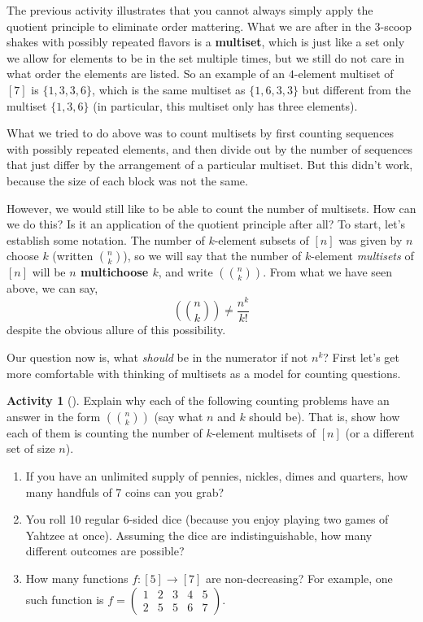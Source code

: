 \documentclass[10pt,]{book}
\newcommand{\terminology}[1]{\textbf{#1}}
\theoremstyle{plain}
\theoremstyle{definition}
\theoremstyle{definition}
\theoremstyle{definition}
\newtheorem{activity}[project]{Activity}
\theoremstyle{definition}
\numberwithin{equation}{chapter}
\newcommand{\mchoose}[2]{\left(\!\binom{#1}{#2}\!\right)}
\newcommand{\twoline}[2]{\begin{pmatrix}#1 \\ #2 \end{pmatrix}}
\newcommand{\amp}{&}
\begin{document}
\hypertarget{p-712}{}%
The previous activity illustrates that you cannot always simply apply the quotient principle to eliminate order mattering.  What we are after in the 3-scoop shakes with possibly repeated flavors is a \terminology{multiset}, which is just like a set only we allow for elements to be in the set multiple times, but we still do not care in what order the elements are listed.  So an example of an \(4\)-element multiset of \([7]\) is \(\{1,3,3,6\}\), which is the same multiset as \(\{1,6,3,3\}\) but different from the multiset \(\{1,3,6\}\) (in particular, this multiset only has three elements).%
\par
\hypertarget{p-713}{}%
What we tried to do above was to count multisets by first counting sequences with possibly repeated elements, and then divide out by the number of sequences that just differ by the arrangement of a particular multiset.  But this didn't work, because the size of each block was not the same.%
\par
\hypertarget{p-714}{}%
However, we would still like to be able to count the number of multisets.  How can we do this?  Is it an application of the quotient principle after all?  To start, let's establish some notation.  The number of \(k\)-element subsets of \([n]\) was given by \(n\) choose \(k\) (written \(\binom{n}{k}\)), so we will say that the number of \(k\)-element \emph{multisets} of \([n]\) will be \terminology{\(n\) multichoose \(k\)}, and write \(\mchoose{n}{k}\).  From what we have seen above, we can say,%
\begin{equation*}
\mchoose{n}{k} \ne \frac{n^k}{k!}
\end{equation*}
despite the obvious allure of this possibility.%
\par
\hypertarget{p-715}{}%
Our question now is, what \emph{should} be in the numerator if not \(n^k\)?  First let's get more comfortable with thinking of multisets as a model for counting questions.%
\begin{activity}[]\label{activity-63}
\hypertarget{p-716}{}%
Explain why each of the following counting problems have an answer in the form \(\mchoose{n}{k}\) (say what \(n\) and \(k\) should be).  That is, show how each of them is counting the number of \(k\)-element multisets of \([n]\) (or a different set of size \(n\)).%
\begin{enumerate}[font=\bfseries,label=(\alph*),ref=\alph*]
\item\label{task-84} \hypertarget{p-717}{}%
If you have an unlimited supply of pennies, nickles, dimes and quarters, how many handfuls of 7 coins can you grab?%
\item\label{task-85} \hypertarget{p-718}{}%
You roll 10 regular 6-sided dice (because you enjoy playing two games of Yahtzee at once).  Assuming the dice are indistinguishable, how many different outcomes are possible?%
\item\label{task-86} \hypertarget{p-719}{}%
How many functions \(f:[5] \to [7]\) are non-decreasing?  For example, one such function is \(f = \twoline{1 \amp 2 \amp 3 \amp 4 \amp 5}{2 \amp 5 \amp 5 \amp 6 \amp 7}\).%
\end{enumerate}
\end{activity}
\end{document}
